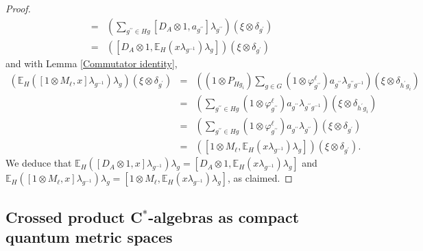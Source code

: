 \documentclass[a4paper,11pt,reqno]{amsart}
\numberwithin{equation}{section}
\numberwithin{equation}{section}
\theoremstyle{definition}
\theoremstyle{remark}
\theoremstyle{remark}
\begin{document}
\begin{proof}
\begin{eqnarray}
\nonumber
&=& (\sum_{g^{\prime\prime}\in Hg}[D_{A}\otimes1,a_{g^{\prime\prime}}]\lambda_{g^{\prime\prime}})(\xi\otimes\delta_{g^{\prime}}) \\
\nonumber
&=& \left([D_{A}\otimes1,\mathbb{E}_{H}(x\lambda_{g^{-1}})\lambda_{g}]\right)(\xi\otimes\delta_{g^{\prime}})
\end{eqnarray}
and with Lemma \ref{Commutator identity},
\begin{eqnarray}
\nonumber
\left(\mathbb{E}_{H}([1\otimes M_{\ell},x]\lambda_{g^{-1}})\lambda_{g}\right)(\xi\otimes\delta_{g^{\prime}}) &=& ((1\otimes P_{Hg_{i}})\sum_{g\in G}(1\otimes\varphi_{g^{\prime\prime}}^{\ell})a_{g^{\prime\prime}}\lambda_{g^{\prime\prime}g^{-1}})(\xi\otimes\delta_{h^{\prime}g_{i}}) \\
\nonumber
&=& (\sum_{g^{\prime\prime}\in Hg}(1\otimes\varphi_{g^{\prime\prime}}^{\ell})a_{g^{\prime\prime}}\lambda_{g^{\prime\prime}g^{-1}})(\xi\otimes\delta_{h^{\prime}g_{i}}) \\
\nonumber
&=& (\sum_{g^{\prime\prime}\in Hg}(1\otimes\varphi_{g^{\prime\prime}}^{\ell})a_{g^{\prime\prime}}\lambda_{g^{\prime\prime}})(\xi\otimes\delta_{g^{\prime}}) \\
\nonumber
&=& ([1\otimes M_{\ell},\mathbb{E}_{H}(x\lambda_{g^{-1}})\lambda_{g}])(\xi\otimes\delta_{g^{\prime}}).
\end{eqnarray}
We deduce that $\mathbb{E}_{H}([D_{A}\otimes1,x]\lambda_{g^{-1}})\lambda_{g}=[D_{A}\otimes1,\mathbb{E}_{H}(x\lambda_{g^{-1}})\lambda_{g}]$
and $\mathbb{E}_{H}([1\otimes M_{\ell},x]\lambda_{g^{-1}})\lambda_{g}=[1\otimes M_{\ell},\mathbb{E}_{H}(x\lambda_{g^{-1}})\lambda_{g}]$,
as claimed. \end{proof}

\vspace{3mm}


\subsection{Crossed product C$^{\ast}$-algebras as compact quantum metric spaces\label{MainPart}}
\end{document}
